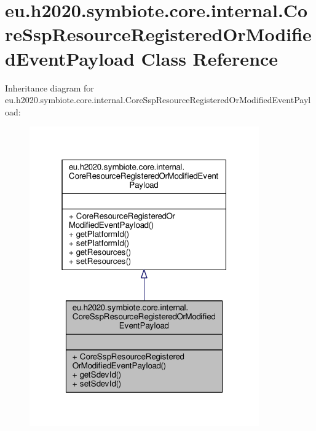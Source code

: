 \hypertarget{classeu_1_1h2020_1_1symbiote_1_1core_1_1internal_1_1CoreSspResourceRegisteredOrModifiedEventPayload}{}\section{eu.\+h2020.\+symbiote.\+core.\+internal.\+Core\+Ssp\+Resource\+Registered\+Or\+Modified\+Event\+Payload Class Reference}
\label{classeu_1_1h2020_1_1symbiote_1_1core_1_1internal_1_1CoreSspResourceRegisteredOrModifiedEventPayload}


Inheritance diagram for eu.\+h2020.\+symbiote.\+core.\+internal.\+Core\+Ssp\+Resource\+Registered\+Or\+Modified\+Event\+Payload\+:
\nopagebreak
\begin{figure}[H]
\begin{center}
\leavevmode
\includegraphics[width=280pt]{classeu_1_1h2020_1_1symbiote_1_1core_1_1internal_1_1CoreSspResourceRegisteredOrModifiedEventPayload__inherit__graph}
\end{center}
\end{figure}


